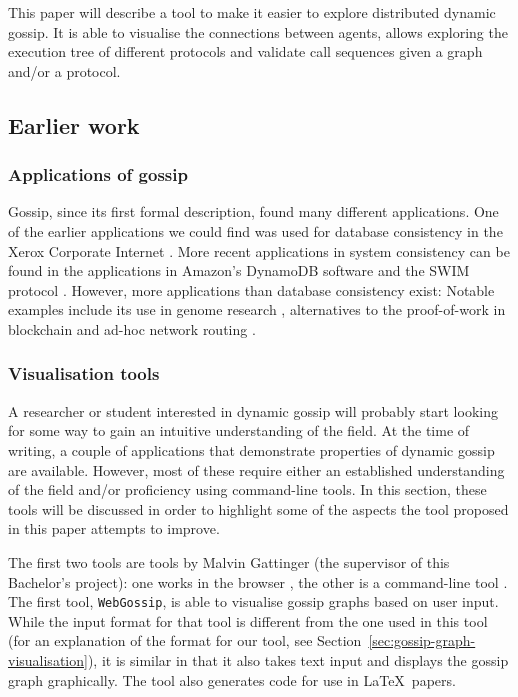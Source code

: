 This paper will describe a tool to make it easier to explore distributed dynamic gossip.
It is able to visualise the connections between agents,
allows exploring the execution tree of different protocols and validate call sequences given a graph and/or a protocol.

\subsection{Earlier work}

\subsubsection{Applications of gossip}

Gossip, since its first formal description, found many different applications.
One of the earlier applications we could find was used for database consistency in the Xerox Corporate Internet \parencite{demers_epidemic_1988}.
More recent applications in system consistency can be found in the applications in Amazon's DynamoDB software \parencite{decandia_dynamo_2007} and the SWIM protocol \parencite{das_swim_2002}.
However, more applications than database consistency exist:
Notable examples include its use in genome research \parencite{liben-nowell_gossip_2002},
alternatives to the proof-of-work in blockchain \parencite{renesse_blockchain_2016,baird_swirlds_2016} and ad-hoc network routing \parencite{haas_gossip-based_2006,korecki_balancing_2020}.

\subsubsection{Visualisation tools}

A researcher or student interested in dynamic gossip will probably start looking for some way to gain an intuitive understanding of the field.
At the time of writing, a couple of applications that demonstrate properties of dynamic gossip are available.
However, most of these require either an established understanding of the field and/or proficiency using command-line tools.
In this section, these tools will be discussed in order to highlight some of the aspects the tool proposed in this paper attempts to improve.

The first two tools are tools by Malvin Gattinger (the supervisor of this Bachelor's project):
one works in the browser \parencite{gattinger_webgossip_2016}, the other is a command-line tool \parencite{gattinger_m4lvingomoche_2020}. 
The first tool, \texttt{WebGossip}, is able to visualise gossip graphs based on user input.
While the input format for that tool is different from the one used in this tool
(for an explanation of the format for our tool, see Section~\ref{sec:gossip-graph-visualisation}),
it is similar in that it also takes text input and displays the gossip graph graphically.
The tool also generates code for use in \LaTeX\ papers.

